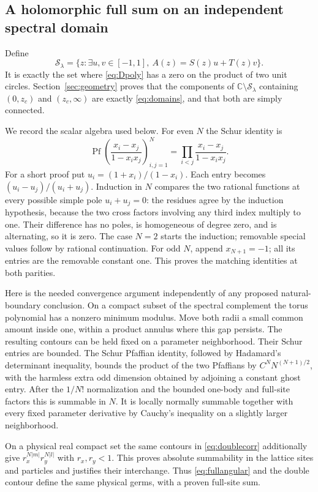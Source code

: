 \documentclass[11pt]{article}
\numberwithin{equation}{section}
\theoremstyle{definition}
\newcommand{\C}{\mathbb C}
\newcommand{\cS}{\mathcal S}
\begin{document}
\subsection{A holomorphic full sum on an independent spectral domain}
Define
\begin{equation}\label{eq:physicalspectralset}
 \cS_\lambda=\{z:\exists u,v\in[-1,1],\ A(z)=S(z)u+T(z)v\}.
\end{equation}
It is exactly the set where \eqref{eq:Dpoly} has a zero on the product
of two unit circles. Section~\ref{sec:geometry} proves that the components
of $\C\setminus\cS_\lambda$ containing $(0,z_c)$ and $(z_c,\infty)$
are exactly \eqref{eq:domains}, and that both are simply connected.

We record the scalar algebra used below.  For even $N$ the Schur
identity is
\[
 \operatorname{Pf}\left(\frac{x_i-x_j}{1-x_ix_j}\right)_{i,j=1}^N
       =\prod_{i<j}\frac{x_i-x_j}{1-x_ix_j}.
\]
For a short proof put $u_i=(1+x_i)/(1-x_i)$.  Each entry becomes
$(u_i-u_j)/(u_i+u_j)$.  Induction in $N$ compares the two rational
functions at every possible simple pole $u_i+u_j=0$: the residues
agree by the induction hypothesis, because the two cross factors
involving any third index multiply to one.  Their difference has no
poles, is homogeneous of degree zero, and is alternating, so it is
zero.  The case $N=2$ starts the induction; removable special values
follow by rational continuation.  For odd $N$, append $x_{N+1}=-1$;
all its entries are the removable constant one.  This proves the
matching identities at both parities.

Here is the needed convergence argument independently of any proposed
natural-boundary conclusion. On a compact subset of the spectral
complement the torus polynomial has a nonzero minimum modulus. Move
both radii a small common amount inside one, within a product annulus
where this gap persists. The resulting contours can be held fixed on
a parameter neighborhood. Their Schur entries are bounded. The Schur
Pfaffian identity, followed by Hadamard's determinant inequality, bounds
the product of the two Pfaffians by
$C^N N^{(N+1)/2}$, with the harmless extra odd dimension obtained by
adjoining a constant ghost entry. After the $1/N!$ normalization and
the bounded one-body and full-site factors this is summable in $N$.
It is locally normally summable together with every fixed parameter
derivative by Cauchy's inequality on a slightly larger neighborhood.

On a physical real compact set the same contours in
\eqref{eq:doublecorr} additionally give
$r_x^{N|m|}r_y^{N|l|}$ with $r_x,r_y<1$. This proves absolute summability
in the lattice sites and particles and justifies their interchange.
Thus \eqref{eq:fullangular} and the double contour define the same
physical germs, with a proven full-site sum.
\end{document}
